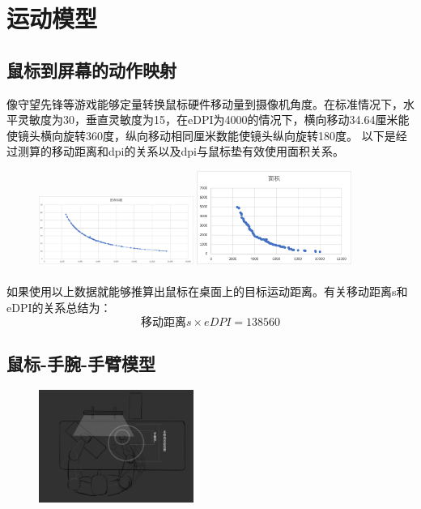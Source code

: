 \documentclass[UTF8]{ctexart}
\begin{document}
\newpage
\section{运动模型}
\subsection{鼠标到屏幕的动作映射}像守望先锋等游戏能够定量转换鼠标硬件移动量到摄像机角度。在标准情况下，水平灵敏度为30，垂直灵敏度为15，在eDPI为4000的情况下，横向移动34.64厘米能使镜头横向旋转360度，纵向移动相同厘米数能使镜头纵向旋转180度。
\newline
以下是经过测算的移动距离和dpi的关系以及dpi与鼠标垫有效使用面积关系。
\begin{figure}[htbp]
    \includegraphics[width=0.45\textwidth]{calculate.png}
    \includegraphics[width=0.45\textwidth]{field.png}
\end{figure}
\paragraph{}如果使用以上数据就能够推算出鼠标在桌面上的目标运动距离。有关移动距离s和eDPI的关系总结为：
\[移动距离s \times eDPI=138560\]


\subsection{鼠标-手腕-手臂模型}
    \begin{figure}[htbp]
        \centering
        \includegraphics[width=0.45\textwidth]{desktop.png}
    \end{figure}
\end{document}
